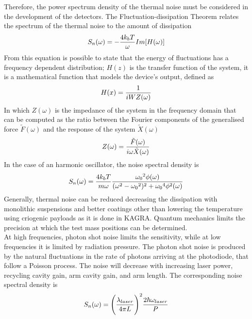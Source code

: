 \documentclass[binding=0.6cm, LaM]{sapthesis}
\begin{document}
        Therefore, the power spectrum density of the thermal noise must be considered in the development of the detectors.
        The Fluctuation-dissipation Theorem relates the spectrum of the thermal noise to the amount of dissipation
                \begin{equation}
                	S_{n}(\omega) = - {{4k_bT} \over {\omega}} Im[H(\omega)]
                \end{equation}
        From this equation is possible to state that the energy of fluctuations has a frequency dependent distribution;
        $H(z)$ is the transfer function of the system, it is a mathematical function that models the device’s output, defined as
                \begin{equation}
                	H(x) = {1 \over {iWZ(\omega)}}
                \end{equation}
        In which $Z(\omega)$ is the impedance of the system in the frequency domain that can be computed as the ratio
        between the Fourier components of the generalised force $\tilde F(\omega)$ and the response of the system $\tilde X(\omega)$
                \begin{equation}
                	Z(\omega) = {{\tilde F(\omega)} \over {i\omega \tilde X(\omega)}}
                \end{equation}
        In the case of an harmonic oscillator, the noise spectral density is
                \begin{equation}
                	S_n(\omega) = {{4k_bT} \over {m\omega}} {{{\omega_0}^2 \phi(\omega)} \over {(\omega^2-{\omega_0}^2)^2 + {\omega_0}^4 \phi^2(\omega)}}
		\end{equation} 
	Generally, thermal noise can be reduced decreasing the dissipation with monolithic suspensions and better coatings
        other than lowering the temperature using criogenic payloads as it is done in KAGRA.
        Quantum mechanics limits the precision at which the test mass positions can be determined. \\
        At high frequencies, photon shot noise limits the sensitivity, 
	while at low frequencies it is limited by radiation pressure.
        The photon shot noise is produced by the natural fluctuations in the rate of photons arriving at the photodiode,
        that follow a Poisson process. The noise will decrease with increasing laser power,
        recycling cavity gain, arm cavity gain, and arm length.
        The corresponding noise spectral density is
		\begin{equation}
                	S_n(\omega) = \Bigg({{\lambda_{laser}} \over {4 \pi L}}\Bigg)^2 {{2 \hbar \omega_{laser}} \over {P}}
                \end{equation}
\end{document}
